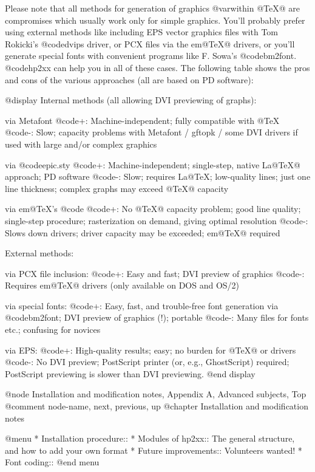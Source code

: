 Please note that all methods for generation of graphics @var{within}
@TeX{}@ are compromises which usually work only for simple graphics.
You'll probably prefer using external methods like including EPS vector
graphics files with Tom Rokicki's @code{dvips} driver, or PCX files via the
em@TeX{}@ drivers, or you'll generate special fonts with convenient
programs like F. Sowa's @code{bm2font}. @code{hp2xx} can help you in all
of these cases. The following table shows the pros and cons of the
various approaches (all are based on PD software):

@display
Internal methods (all allowing DVI previewing of graphs):

via Metafont
  @code{+:} Machine-independent; fully compatible with @TeX{}
  @code{-:} Slow; capacity problems with Metafont / gftopk / some DVI drivers
            if used with large and/or complex graphics

via @code{epic.sty}
  @code{+:} Machine-independent; single-step, native La@TeX{}@ approach; PD software
  @code{-:} Slow; requires La@TeX{}; low-quality lines; just one line thickness;
            complex graphs may exceed @TeX{}@ capacity

via em@TeX{}'s @code{}
  @code{+:} No @TeX{}@ capacity problem; good line quality; single-step procedure;
            rasterization on demand, giving optimal resolution
  @code{-:} Slows down drivers; driver capacity may be exceeded; em@TeX{}@ required


External methods:

via PCX file inclusion:
  @code{+:} Easy and fast; DVI preview of graphics
  @code{-:} Requires em@TeX{}@ drivers (only available on DOS and OS/2)

via special fonts:
  @code{+:} Easy, fast, and trouble-free font generation via @code{bm2font};
            DVI preview of graphics (!); portable
  @code{-:} Many files for fonts etc.; confusing for novices

via EPS:
  @code{+:} High-quality results; easy; no burden for @TeX{}@ or drivers
  @code{-:} No DVI preview; PostScript printer (or, e.g., GhostScript) required;
            PostScript previewing is slower than DVI previewing.
@end display




@node Installation and modification notes, Appendix A, Advanced subjects, Top
@comment  node-name,  next,  previous,  up
@chapter Installation and modification notes

@menu
* Installation procedure::
* Modules of hp2xx::       The general structure, and how to add your own format
* Future improvements::    Volunteers wanted!
* Font coding::
@end menu

